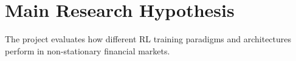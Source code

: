 \documentclass[10pt]{article}
\begin{document}

\section{Main Research Hypothesis}

The project evaluates how different RL training paradigms and architectures perform in non-stationary financial markets. 
\end{document}
